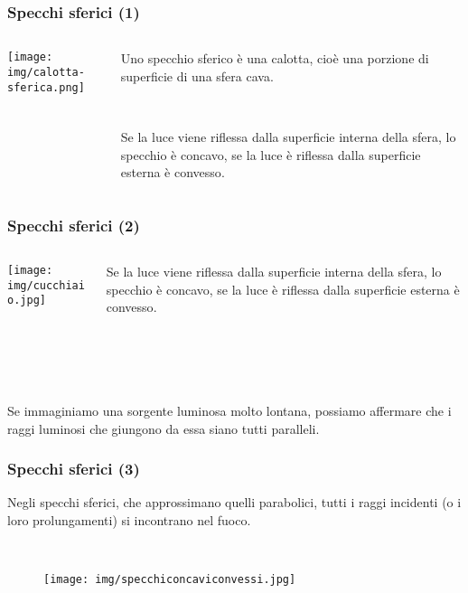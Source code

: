 \documentclass[]{beamer}
\theoremstyle{plain}
\begin{document}
\begin{frame}
\frametitle{Specchi sferici (1)}
\begin{columns}
\begin{column}{0.3\textwidth}
\texttt{[image: img/calotta-sferica.png]}
\end{column}
\begin{column}{0.6\textwidth}
  Uno specchio sferico è una calotta, cioè una porzione di superficie di una sfera cava.\pause

  ~

  Se la luce viene riflessa dalla superficie interna della sfera, lo specchio è \alert<2>{concavo}, se la luce è riflessa dalla superficie esterna è \alert<2>{convesso}.
\end{column}
\end{columns}
\end{frame}



\begin{frame}
\frametitle{Specchi sferici (2)}
\begin{columns}
\begin{column}{0.5\textwidth}
\texttt{[image: img/cucchiaio.jpg]}
\end{column}
\begin{column}{0.4\textwidth}
  Se la luce viene riflessa dalla superficie interna della sfera, lo specchio è \alert<2>{concavo}, se la luce è riflessa dalla superficie esterna è \alert<2>{convesso}.
\end{column}
\end{columns}\pause

~

~

Se immaginiamo una sorgente luminosa molto lontana, possiamo affermare che i raggi luminosi che giungono da essa siano tutti paralleli.
\end{frame}



\begin{frame}
\frametitle{Specchi sferici (3)}
Negli specchi sferici, che approssimano quelli parabolici, tutti i raggi incidenti (o i loro prolungamenti) si incontrano nel \alert<1>{fuoco}.

~

\begin{figure}
  \texttt{[image: img/specchiconcaviconvessi.jpg]}
\end{figure}
\end{frame}
\end{document}
